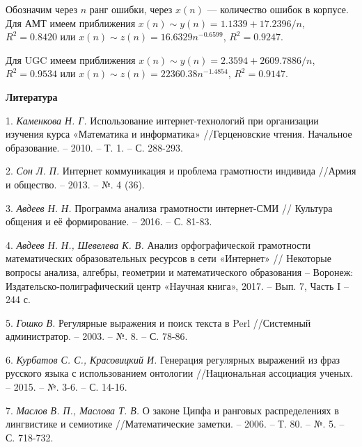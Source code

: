 Обозначим через $n$ ранг ошибки, через $x(n)$ --- количество ошибок в корпусе.
Для АМТ имеем приближения
$x(n) \sim y(n) = 1.1339+{17.2396}/{n}$, $R^2 = 0.8420$ или
$x(n) \sim z(n) = 16.6329n^{-0.6599}      $, $R^2 = 0.9247$.

Для UGC имеем приближения
$x(n) \sim y(n) = 2.3594+{2609.7886}/{n}$, $R^2 = 0.9534$ или
$x(n) \sim z(n) = 22360.38n^{-1.4854}         $, $R^2 = 0.9147$.

\smallskip \centerline{\bf Литература}\nopagebreak

1. {\it Каменкова Н. Г. } Использование интернет-технологий при организации изучения курса «Математика и информатика» //Герценовские чтения. Начальное образование. – 2010. – Т. 1. – С. 288-293.

2. {\it Сон Л. П.} Интернет коммуникация и проблема грамотности индивида //Армия и общество. – 2013. – №. 4 (36).

3. {\it Авдеев Н. Н.} Программа анализа грамотности интер\-нет\--СМИ // Культура общения и её формирование. – 2016. – С. 81-83.

4. {\it Авдеев Н. Н., Шевелева К. В.} Анализ орфографической грамотности
математических образовательных ресурсов в сети «Интернет» // Некоторые вопросы анализа, алгебры, геометрии и математического
образования – Воронеж: Издательско-полиграфический центр «Научная книга», 2017. – Вып. 7, Часть I – 244 с.

5. \textit{Гошко В.} Регулярные выражения и поиск текста в Perl //Системный администратор. – 2003. – №. 8. – С. 78-86.

6. \textit{Курбатов С. С., Красовицкий И.}
Генерация регулярных выражений из фраз русского языка с использованием онтологии //Национальная ассоциация ученых. – 2015. – №. 3-6. – С. 14-16.

7. \textit{Маслов В. П., Маслова Т. В.} О законе Ципфа и ранговых распределениях в лингвистике и семиотике //Математические заметки. – 2006. – Т. 80. – №. 5. – С. 718-732.
